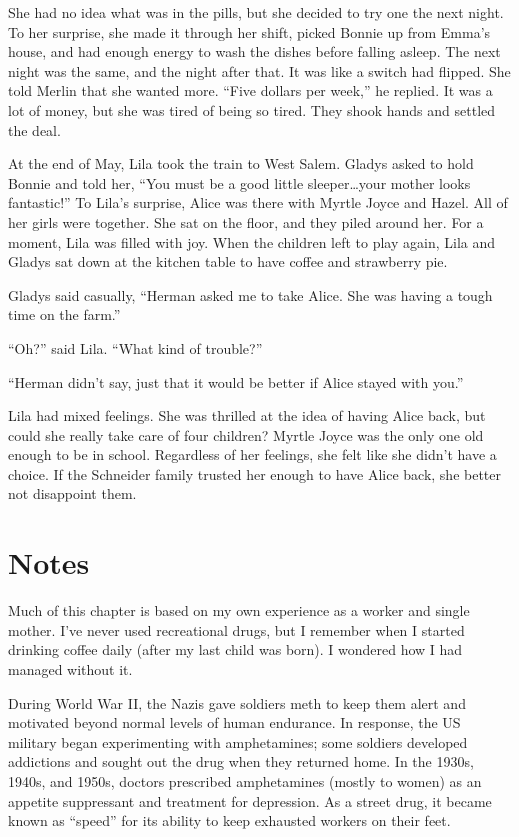 \documentclass[
  letterpaper,
]{book}
\begin{document}
She had no idea what was in the pills, but she decided to try one the
next night. To her surprise, she made it through her shift, picked
Bonnie up from Emma's house, and had enough energy to wash the dishes
before falling asleep. The next night was the same, and the night after
that. It was like a switch had flipped. She told Merlin that she wanted
more. ``Five dollars per week,'' he replied. It was a lot of money, but
she was tired of being so tired. They shook hands and settled the deal.

At the end of May, Lila took the train to West Salem. Gladys asked to
hold Bonnie and told her, ``You must be a good little sleeper\ldots your
mother looks fantastic!'' To Lila's surprise, Alice was there with
Myrtle Joyce and Hazel. All of her girls were together. She sat on the
floor, and they piled around her. For a moment, Lila was filled with
joy. When the children left to play again, Lila and Gladys sat down at
the kitchen table to have coffee and strawberry pie.

Gladys said casually, ``Herman asked me to take Alice. She was having a
tough time on the farm.''

``Oh?'' said Lila. ``What kind of trouble?''

``Herman didn't say, just that it would be better if Alice stayed with
you.''

Lila had mixed feelings. She was thrilled at the idea of having Alice
back, but could she really take care of four children? Myrtle Joyce was
the only one old enough to be in school. Regardless of her feelings, she
felt like she didn't have a choice. If the Schneider family trusted her
enough to have Alice back, she better not disappoint them.

\section{Notes}\label{notes-54}

Much of this chapter is based on my own experience as a worker and
single mother. I've never used recreational drugs, but I remember when I
started drinking coffee daily (after my last child was born). I wondered
how I had managed without it.

During World War II, the Nazis gave soldiers meth to keep them alert and
motivated beyond normal levels of human endurance. In response, the US
military began experimenting with amphetamines; some soldiers developed
addictions and sought out the drug when they returned home. In the
1930s, 1940s, and 1950s, doctors prescribed amphetamines (mostly to
women) as an appetite suppressant and treatment for depression. As a
street drug, it became known as ``speed'' for its ability to keep
exhausted workers on their feet.
\end{document}
